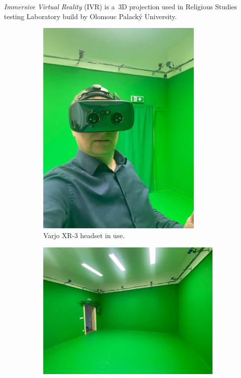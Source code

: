 \emph{Immersive Virtual Reality} (IVR) is a~3D projection used in Religious Studies testing Laboratory build by Olomouc Palacký University.~\cite{upol2021procurement}

\begin{figure}[!ht]\centering
    \begin{subfigure}[b]{0.38\textwidth}
        \centering
        \includegraphics[width=0.89\textwidth]{img/ivr-supervisor.png}
        \caption{Varjo XR-3 headset in use.}
        \label{fig:ivr-sup}
    \end{subfigure}
    \hfill
    \begin{subfigure}[b]{0.6\textwidth}
        \centering
        \includegraphics[width=\textwidth]{img/ivr-lab.png}

\end{subfigure}
\end{figure}
